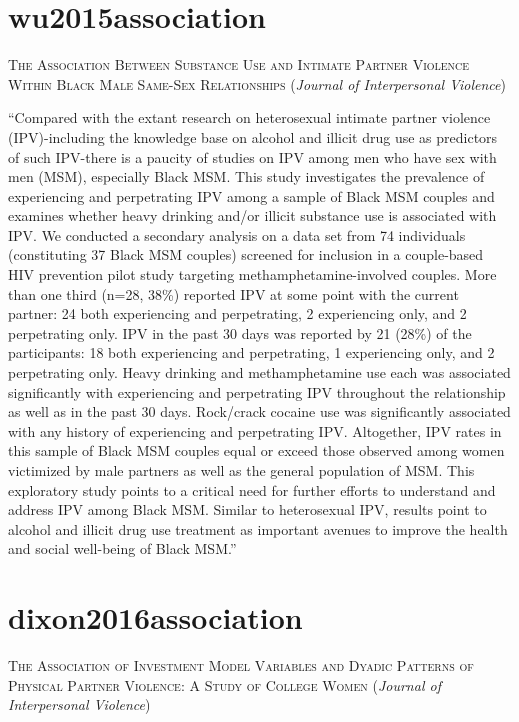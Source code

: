 \documentclass[]{tufte-handout}
\begin{document}
\section{\texorpdfstring{\textcolor[HTML]{5b0057}{wu2015association}}{}}\label{section-61}

\textsc{\large{The Association Between Substance Use and Intimate Partner Violence Within Black Male Same-Sex Relationships}}
(\emph{Journal of Interpersonal Violence})

``Compared with the extant research on heterosexual intimate partner
violence (IPV)-including the knowledge base on alcohol and illicit drug
use as predictors of such IPV-there is a paucity of studies on IPV among
men who have sex with men (MSM), especially Black MSM. This study
investigates the prevalence of experiencing and perpetrating IPV among a
sample of Black MSM couples and examines whether heavy drinking and/or
illicit substance use is associated with IPV. We conducted a secondary
analysis on a data set from 74 individuals (constituting 37 Black MSM
couples) screened for inclusion in a couple-based HIV prevention pilot
study targeting methamphetamine-involved couples. More than one third
(n=28, 38\%) reported IPV at some point with the current partner: 24
both experiencing and perpetrating, 2 experiencing only, and 2
perpetrating only. IPV in the past 30 days was reported by 21 (28\%) of
the participants: 18 both experiencing and perpetrating, 1 experiencing
only, and 2 perpetrating only. Heavy drinking and methamphetamine use
each was associated significantly with experiencing and perpetrating IPV
throughout the relationship as well as in the past 30 days. Rock/crack
cocaine use was significantly associated with any history of
experiencing and perpetrating IPV. Altogether, IPV rates in this sample
of Black MSM couples equal or exceed those observed among women
victimized by male partners as well as the general population of MSM.
This exploratory study points to a critical need for further efforts to
understand and address IPV among Black MSM. Similar to heterosexual IPV,
results point to alcohol and illicit drug use treatment as important
avenues to improve the health and social well-being of Black MSM.''

\section{\texorpdfstring{\textcolor[HTML]{5b0057}{dixon2016association}}{}}\label{section-62}

\textsc{\large{The Association of Investment Model Variables and Dyadic Patterns of Physical Partner Violence: A Study of College Women}}
(\emph{Journal of Interpersonal Violence})
\end{document}
